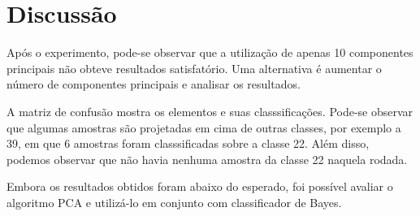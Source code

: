 \documentclass[12pt]{article}
\begin{document}
\section{Discussão}

  \par Após o experimento, pode-se observar que a utilização de apenas 10 componentes principais não obteve resultados satisfatório. Uma alternativa é aumentar o número de componentes principais e analisar os resultados. 
  
  \par A matriz de confusão mostra os elementos e suas classsificações. Pode-se observar que algumas amostras são projetadas em cima de outras classes, por exemplo a 39, em que 6 amostras foram classsificadas sobre a classe 22. Além disso, podemos observar que não havia nenhuma amostra da classe 22 naquela rodada. 
  
  \par Embora os resultados obtidos foram abaixo do esperado, foi possível avaliar o algoritmo PCA e utilizá-lo em conjunto com classificador de Bayes. 


\end{document}
